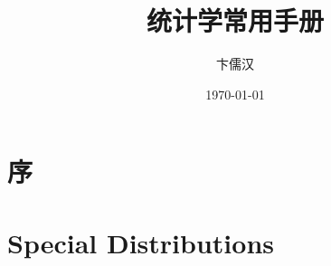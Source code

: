 \documentclass[a4,cn,single]{elegantbook}
\title{统计学常用手册}
\author{卞儒汉}
\date{\today}
\begin{document}
\tableofcontents


\chapter*{序}
\chapter{Special Distributions}
	
	
	
	
	
\end{document}
